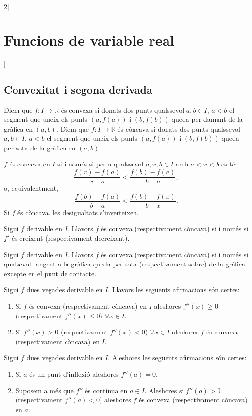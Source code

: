 \documentclass[class=article,10pt,crop=false]{standalone}
\begin{document}
\begin{multicols}{2}[\section{Funcions de variable real}]
\subsection{Convexitat i segona derivada}
\begin{definition}
Diem que $f:I\rightarrow\mathbb{R}$ és convexa si donats dos punts qualssevol $a,b\in I$, $a<b$ el segment que uneix els punts $(a,f(a))$ i $(b,f(b))$ queda per damunt de la gràfica en $(a,b)$. Diem que $f:I\rightarrow\mathbb{R}$ és còncava si donats dos punts qualssevol $a,b\in I$, $a<b$ el segment que uneix els punts $(a,f(a))$ i $(b,f(b))$ queda per sota de la gràfica en $(a,b)$.
\end{definition}
\begin{lemma}
$f$ és convexa en $I$ si i només si per a qualssevol $a,x,b\in I$ amb $a<x<b$ es té: $$\frac{f(x)-f(a)}{x-a}<\frac{f(b)-f(a)}{b-a},$$ o, equivalentment, $$\frac{f(b)-f(a)}{b-a}<\frac{f(b)-f(x)}{b-x}.$$
Si $f$ és còncava, les desigualtats s'inverteixen.
\end{lemma}
\begin{theorem}
Sigui $f$ derivable en $I$. Llavors $f$ és convexa (respectivament còncava) si i només si $f'$ és creixent (respectivament decreixent).
\end{theorem}
\begin{theorem}
Sigui $f$ derivable en $I$. Llavors $f$ és convexa (respectivament còncava) si i només si qualsevol tangent a la gràfica queda per sota (respectivament sobre) de la gràfica excepte en el punt de contacte.
\end{theorem}
\begin{theorem}
Sigui $f$ dues vegades derivable en $I$. Llavors les següents afirmacions són certes:
\begin{enumerate}
    \item Si $f$ és convexa (respectivament còncava) en $I$ aleshores $f''(x)\geq 0$ (respectivament $f''(x)\leq 0$) $\forall x\in I$.
    \item Si $f''(x)>0$ (respectivament $f''(x)<0$) $\forall x\in I$ aleshores $f$ és convexa (respectivament còncava) en $I$.
\end{enumerate}
\begin{prop}
Sigui $f$ dues vegades derivable en $I$. Aleshores les següents afirmacions són certes:
\begin{enumerate}
    \item Si $a$ és un punt d'inflexió aleshores $f''(a)=0$.
    \item Suposem a més que $f''$ és contínua en $a\in I$. Aleshores si $f''(a)>0$ (respectivament $f''(a)<0$) aleshores $f$ és convexa (respectivament còncava) en $a$.
\end{enumerate}
\end{prop}
\end{theorem}

\end{multicols}
\end{document}
